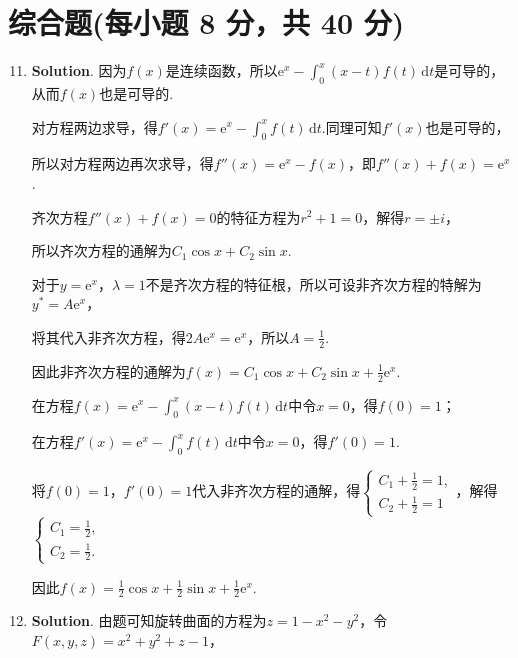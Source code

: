 \documentclass[../main.tex]{subfiles}
\begin{document}
\section{综合题(每小题 8 分，共 40 分)}
\begin{enumerate}
    \setcounter{enumi}{10}
    \item \textbf{Solution}. 因为$f(x)$是连续函数，所以$\mathrm{e}^{x}-\int_{0}
              ^{x}(x-t)f(t)\,\mathrm{d}t$是可导的，从而$f(x)$也是可导的.

          对方程两边求导，得$f'(x) = \mathrm{e}^{x} - \int_{0}^{x}f(t)\,\mathrm{d}t$.同理可知$f
              '(x)$也是可导的，

          所以对方程两边再次求导，得$f''(x) = \mathrm{e}^{x} - f(x)$，即$f''(x)+f(x) =
              \mathrm{e}^{x}$.

          齐次方程$f''(x)+f(x)=0$的特征方程为$r^{2}+1=0$，解得$r=\pm i$，

          所以齐次方程的通解为$C_{1}\cos x + C_{2}\sin x$.

          对于$y=\mathrm{e}^{x}$，$\lambda = 1$不是齐次方程的特征根，所以可设非齐次方程的特解为$y
                  ^{*} = A\mathrm{e}^{x}$，

          将其代入非齐次方程，得$2A\mathrm{e}^{x} = \mathrm{e}^{x}$，所以$A=\frac{1}{2}$.

          因此非齐次方程的通解为$f(x) = C_{1}\cos x + C_{2}\sin x + \frac{1}{2}\mathrm{e}
              ^{x}$.

          在方程$f(x)=\mathrm{e}^{x}-\int_{0}^{x}(x-t)f(t)\,\mathrm{d}t$中令$x=0$，得$f
              (0)=1$；

          在方程$f'(x) = \mathrm{e}^{x} - \int_{0}^{x}f(t)\,\mathrm{d}t$中令$x=0$，得$f
              '(0)=1$.

          将$f(0)=1$，$f'(0)=1$代入非齐次方程的通解，得$\begin{cases}
                  C_{1} + \frac{1}{2}= 1, \\[6pt]
                  C_{2} + \frac{1}{2}= 1
              \end{cases}$，解得$\begin{cases}
                  C_{1} = \frac{1}{2}, \\[6pt]
                  C_{2} = \frac{1}{2}.
              \end{cases}$

          因此$f(x) = \frac{1}{2}\cos x + \frac{1}{2}\sin x + \frac{1}{2}\mathrm{e}^{x}$.

    \item \textbf{Solution}. 由题可知旋转曲面的方程为$z=1-x^{2}-y^{2}$，令$F
              (x,y,z) = x^{2}+y^{2}+z-1$，


\end{enumerate}
\end{document}
